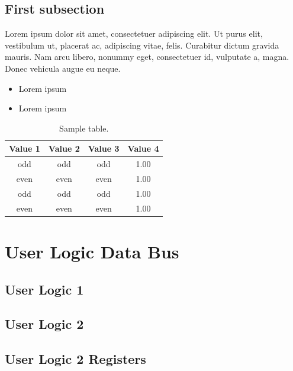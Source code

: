 \documentclass[12pt]{article}
\begin{document}
\subsection{First subsection}
\lipsum[1]

\leftboxbegin
Lorem ipsum dolor sit amet, consectetuer adipiscing elit. Ut purus elit, vestibulum ut, placerat ac, adipiscing vitae, felis. Curabitur dictum gravida mauris. Nam arcu libero, nonummy eget, consectetuer id, vulputate a, magna. Donec vehicula augue eu neque.
\leftboxend

\lipsum[1-2]

\rightboxbegin
\begin{itemize}
	\item Lorem ipsum
	\item Lorem ipsum
\end{itemize}
\rightboxend
\lipsum[1]
\begin{table}[!h]
	\centering
	\caption{Sample table.}
	\begin{tabular}{cccc}
		\toprule
		Value 1 & Value 2 & Value 3 & Value 4 \\
		\midrule
		odd     & odd     & odd     & 1.00    \\
		even    & even    & even    & 1.00    \\
		odd     & odd     & odd     & 1.00    \\
		even    & even    & even    & 1.00    \\
		\bottomrule
	\end{tabular}
\end{table}

\lipsum[1]

\lipsum[1]
\frameboxend

\appendix
\section{User Logic Data Bus}\label{appendix:user_logic_data_bus}
\subsection{User Logic 1}\label{appendix:user_logic_1_data_bus}
\lipsum[1]
\subsection{User Logic 2}\label{appendix:user_logic_2_data_bus}
\lipsum[1]
\subsection{User Logic 2 Registers}\label{appendix:user_logic_2_registers}
\lipsum[1]
\end{document}
